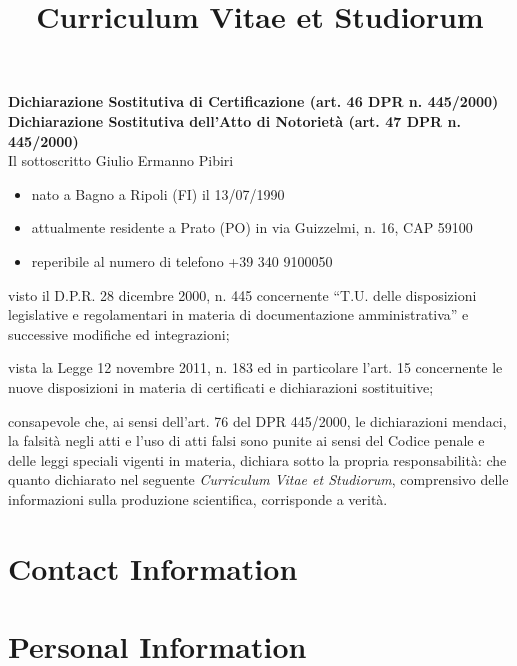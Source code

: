 \documentclass[a4paper, sans]{moderncv}
\title{Curriculum Vitae et Studiorum}
\newcommand{\return}{\vspace{0.3cm}}
\begin{document}
\textbf{Dichiarazione Sostitutiva di Certificazione (art. 46 DPR n. 445/2000)} \\
\textbf{Dichiarazione Sostitutiva dell'Atto di Notorietà (art. 47 DPR n. 445/2000)} \\

Il sottoscritto Giulio Ermanno Pibiri

\begin{itemize}
    \item nato a Bagno a Ripoli (FI) il 13/07/1990
    \item attualmente residente a Prato (PO) in via Guizzelmi, n. 16, CAP 59100
    \item reperibile al numero di telefono +39 340 9100050
\end{itemize}
\return

visto il D.P.R. 28 dicembre 2000, n. 445 concernente ``T.U. delle disposizioni
legislative e regolamentari in materia di documentazione amministrativa''
e successive modifiche ed integrazioni;
\return

vista la Legge 12 novembre 2011, n. 183 ed in particolare l'art. 15 concernente
le nuove disposizioni in materia di certificati e dichiarazioni sostituitive;
\return

consapevole che, ai sensi dell'art. 76 del DPR 445/2000, le dichiarazioni mendaci,
la falsità negli atti e l'uso di atti falsi sono punite ai sensi del Codice penale
e delle leggi speciali vigenti in materia,
dichiara sotto la propria responsabilità:
che quanto dichiarato nel seguente \emph{Curriculum Vitae et Studiorum},
comprensivo delle informazioni sulla produzione scientifica, corrisponde a verità.

\vspace{6cm}

\makecvtitle

\section{Contact Information}

\section{Personal Information}
\end{document}
